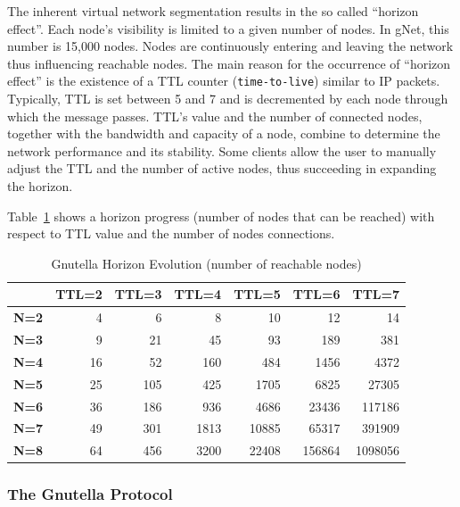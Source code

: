 The inherent virtual network segmentation results in the so called ``horizon
effect''. Each node's visibility is limited to a given number of nodes. In
gNet, this number is 15,000 nodes. Nodes are continuously entering and leaving
the network thus influencing reachable nodes. The main reason for the
occurrence of ``horizon effect'' is the existence of a TTL counter
(\texttt{time-to-live}) similar to IP packets. Typically, TTL is set between 5
and 7 and is decremented by each node through which the message passes. TTL's
value and the number of connected nodes, together with the bandwidth and
capacity of a node, combine to determine the network performance and its
stability. Some clients allow the user to manually adjust the TTL and the
number of active nodes, thus succeeding in expanding the horizon.

Table~\ref{tab:p2p-systems:gnutella-horizon} shows a horizon progress
(number of nodes that can be reached) with respect to TTL value and the number
of nodes connections.

\begin{table}[htb]
  \centering
  \caption{Gnutella Horizon Evolution (number of reachable nodes)}
  \label{tab:p2p-systems:gnutella-horizon}
  \begin{tabular}{@{}lrrrrrr@{}}
    \toprule
      & \textbf{TTL=2} & \textbf{TTL=3} & \textbf{TTL=4} & \textbf{TTL=5} &
      \textbf{TTL=6} & \textbf{TTL=7} \\
    \midrule
      \textbf{N=2} & 4 & 6 & 8 & 10 & 12 & 14 \\
      \textbf{N=3} & 9 & 21 & 45 & 93 & 189 & 381 \\
      \textbf{N=4} & 16 & 52 & 160 & 484 & 1456 & 4372 \\
      \textbf{N=5} & 25 & 105 & 425 & 1705 & 6825 & 27305 \\
      \textbf{N=6} & 36 & 186 & 936 & 4686 & 23436 & 117186 \\
      \textbf{N=7} & 49 & 301 & 1813 & 10885 & 65317 & 391909 \\
      \textbf{N=8} & 64 & 456 & 3200 & 22408 & 156864 & 1098056 \\
    \bottomrule
  \end{tabular}
\end{table}

\subsubsection{The Gnutella Protocol}

